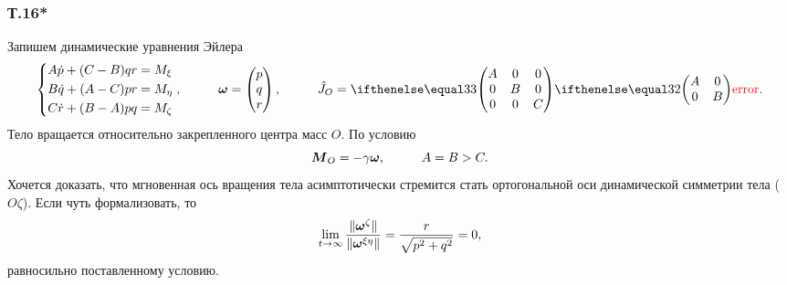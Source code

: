 \subsubsection*{Т.16*}


Запишем динамические уравнения Эйлера
\begin{equation}
    \left\{\begin{aligned}
        A \dot{p} + (C-B) q r &= M_{\xi} \\
        B \dot{q} + (A-C) p r &= M_{\eta} \\
        C \dot{r} + (B-A) p q &= M_{\zeta} \\
    \end{aligned}\right.,
    \hspace{1cm} 
    \vc{\omega} = \begin{pmatrix}
        p \\ q \\ r
    \end{pmatrix}, 
    \hspace{1cm} 
    \hat{J}_O = \dmat{3}{A}{B}{C}.
\end{equation}
Тело вращается относительно закрепленного центра масс $O$. По условию
\begin{equation*}
    \mbox{\boldmath $M$}_O = - \gamma \mbox{\boldmath $\omega$},
    \hspace{1cm} 
    A = B > C.
\end{equation*}
Хочется доказать, что мгновенная ось вращения тела асимптотически стремится стать ортогональной оси динамической симметрии тела ($O\zeta$). Если чуть формализовать, то 
\begin{equation}
\label{lim}
    \lim_{t \to \infty} \frac{\|\mbox{\boldmath $\omega$}^{\zeta}\|}{\|\mbox{\boldmath $\omega$}^{\xi\eta}\|} = \frac{r}{\sqrt{p^2+q^2}} = 0,
\end{equation}
равносильно поставленному условию.

